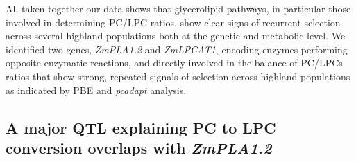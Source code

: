 \documentclass[9pt,twocolumn,twoside]{BioRxiv}
\begin{document}
All taken together our data shows that glycerolipid pathways, in particular those involved in determining PC/LPC ratios, show clear signs of recurrent selection across several highland populations both at the genetic and metabolic level. 
We identified two genes, \textit{ZmPLA1.2} and \textit{ZmLPCAT1}, encoding enzymes performing opposite enzymatic reactions, and directly involved in the balance of PC/LPCs ratios that show strong, repeated signals of selection across highland populations as indicated by PBE and \textit{pcadapt} analysis.

\subsection{A major QTL explaining PC to LPC conversion overlaps with \textit{ZmPLA1.2}} 
\end{document}
